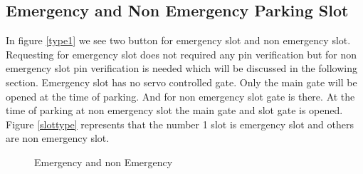 \subsection{Emergency and Non Emergency Parking Slot}
In figure \ref{type1} we see two button for emergency slot and non emergency slot. Requesting for emergency slot does not required any pin verification but for non emergency slot pin verification is needed which will be discussed in the following section. Emergency slot has no servo controlled gate. Only the main gate will be opened at the time of parking. And for non emergency slot gate is there. At the time of parking at non emergency slot the main gate and slot gate is opened. Figure \ref{slottype} represents that the number 1 slot is emergency slot and others are non emergency slot.  

\begin{figure}[H]
\centering
{} 
\hspace{1cm}
\caption{Emergency and non Emergency }
\end{figure}

